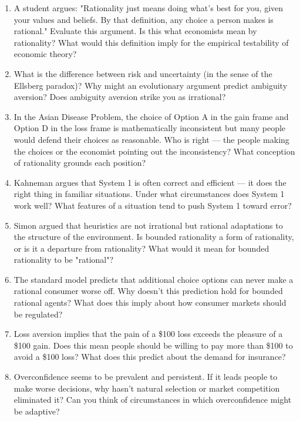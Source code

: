 \documentclass[12pt, letterpaper]{article}
\begin{document}
\begin{enumerate}
\item A student argues: "Rationality just means doing what's best for you, given your values and beliefs. By that definition, any choice a person makes is rational." Evaluate this argument. Is this what economists mean by rationality? What would this definition imply for the empirical testability of economic theory?

\item What is the difference between risk and uncertainty (in the sense of the Ellsberg paradox)? Why might an evolutionary argument predict ambiguity aversion? Does ambiguity aversion strike you as irrational?

\item In the Asian Disease Problem, the choice of Option A in the gain frame and Option D in the loss frame is mathematically inconsistent but many people would defend their choices as reasonable. Who is right --- the people making the choices or the economist pointing out the inconsistency? What conception of rationality grounds each position?

\item Kahneman argues that System 1 is often correct and efficient --- it does the right thing in familiar situations. Under what circumstances does System 1 work well? What features of a situation tend to push System 1 toward error?

\item Simon argued that heuristics are not irrational but rational adaptations to the structure of the environment. Is bounded rationality a form of rationality, or is it a departure from rationality? What would it mean for bounded rationality to be "rational"?

\item The standard model predicts that additional choice options can never make a rational consumer worse off. Why doesn't this prediction hold for bounded rational agents? What does this imply about how consumer markets should be regulated?

\item Loss aversion implies that the pain of a \$100 loss exceeds the pleasure of a \$100 gain. Does this mean people should be willing to pay more than \$100 to avoid a \$100 loss? What does this predict about the demand for insurance?

\item Overconfidence seems to be prevalent and persistent. If it leads people to make worse decisions, why hasn't natural selection or market competition eliminated it? Can you think of circumstances in which overconfidence might be adaptive?


\end{enumerate}
\end{document}
